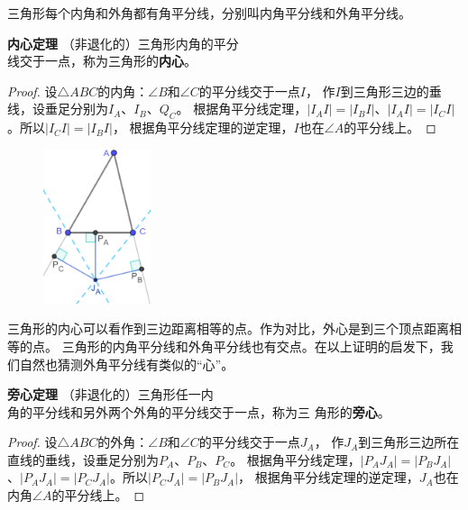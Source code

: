 \documentclass[12pt,UTF8]{ctexbook}
\begin{document}
三角形每个内角和外角都有角平分线，分别叫内角平分线和外角平分线。

\begin{tm}{\textbf{内心定理}}\label{tm:1-2-0}
    （非退化的）三角形内角的平分\\
    线交于一点，称为三角形的\textbf{内心}。
\end{tm}

\begin{proof}
    设$\triangle ABC$的内角：$\angle B$和$\angle C$的平分线交于一点$I$，
    作$I$到三角形三边的垂线，设垂足分别为$I_A$、$I_B$、$Q_C$。
    根据角平分线定理，$|I_AI| = |I_BI|$、$|I_AI| = |I_CI|$。所以$|I_CI| = |I_BI|$，
    根据角平分线定理的逆定理，$I$也在$\angle A$的平分线上。
\end{proof}

\begin{figure} %
    \vspace{-30pt}
    \flushright
    \includegraphics[width=0.28\textwidth]{tu/三角形旁心.png}
\end{figure}

三角形的内心可以看作到三边距离相等的点。作为对比，外心是到三个顶点距离相等的点。
三角形的内角平分线和外角平分线也有交点。在以上证明的启发下，我们自然也猜测外角平分线有类似的“心”。

\begin{tm}{\textbf{旁心定理 }}\label{tm:1-2-1}
    （非退化的）三角形任一内\\
    角的平分线和另外两个外角的平分线交于一点，称为三
    角形的\textbf{旁心}。
\end{tm}

\begin{proof}
    设$\triangle ABC$的外角：$\angle B$和$\angle C$的平分线交于一点$J_A$，
    作$J_A$到三角形三边所在直线的垂线，设垂足分别为$P_A$、$P_B$、$P_C$。
    根据角平分线定理，$|P_AJ_A| = |P_BJ_A|$、$|P_AJ_A| = |P_CJ_A|$。所以$|P_CJ_A| = |P_BJ_A|$，
    根据角平分线定理的逆定理，$J_A$也在内角$\angle A$的平分线上。
\end{proof}
\end{document}

